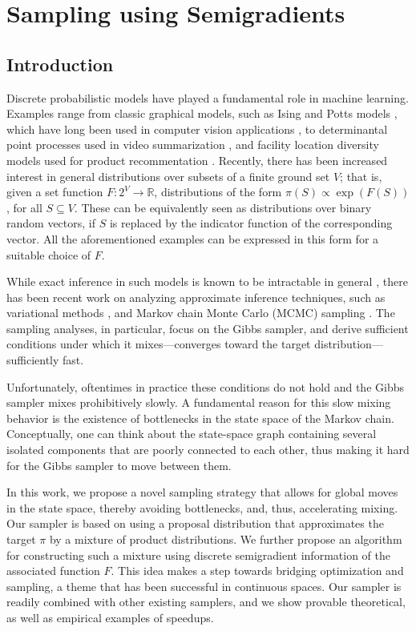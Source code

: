 \chapter{Sampling using Semigradients} \label{ch:m3}

\section{Introduction}
Discrete probabilistic models have played a fundamental role in machine learning.
Examples range from classic graphical models, such as Ising and Potts models \citep{koller09}, which have long been used in computer vision applications \citep{boykov01}, to determinantal point processes \citep{kulesza12} used in video summarization \citep{gong14}, and facility location diversity models used for product recommentation \citep{tschiatschek16}.
Recently, there has been increased interest in general distributions over subsets of a finite ground set $V$; that is, given a set function $F : 2^V \to \mathbb{R}$, distributions of the form $\pi(S) \propto \exp(F(S))$, for all $S \subseteq V$.
These can be equivalently seen as distributions over binary random vectors, if $S$ is replaced by the indicator function of the corresponding vector.
All the aforementioned examples can be expressed in this form for a suitable choice of $F$.

While exact inference in such models is known to be intractable in general \citep{jerrum93}, there has been recent work on analyzing approximate inference techniques, such as variational methods \citep{djolonga14, djolonga16mixed}, and Markov chain Monte Carlo (MCMC) sampling \citep{gotovos15, rebeschini15}.
The sampling analyses, in particular, focus on the Gibbs sampler, and derive sufficient conditions under which it mixes---converges toward the target distribution---sufficiently fast.

Unfortunately, oftentimes in practice these conditions do not hold and the Gibbs sampler mixes prohibitively slowly.
A fundamental reason for this slow mixing behavior is the existence of bottlenecks in the state space of the Markov chain.
Conceptually, one can think about the state-space graph containing several isolated components that are poorly connected to each other, thus making it hard for the Gibbs sampler to move between them.

In this work, we propose a novel sampling strategy that allows for global moves in the state space, thereby avoiding bottlenecks, and, thus, accelerating mixing.
Our sampler is based on using a proposal distribution that approximates the target $\pi$ by a mixture of product distributions.
We further propose an algorithm for constructing such a mixture using discrete semigradient information of the associated function $F$.
This idea makes a step towards bridging optimization and sampling, a theme that has been successful in continuous spaces.
Our sampler is readily combined with other existing samplers, and we show provable theoretical, as well as empirical examples of speedups.

